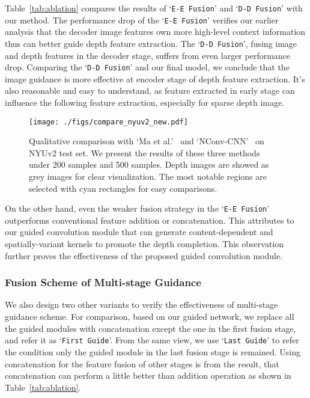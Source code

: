 \documentclass[journal]{IEEEtran}
\begin{document}
Table~\ref{tab:ablation} compares the results of `\texttt{E-E Fusion}' and `\texttt{D-D Fusion}' with our method.
The performance drop of the `\texttt{E-E Fusion}' verifies our earlier analysis that the decoder image features own more high-level context information thus can better guide depth feature extraction. 
The `\texttt{D-D Fusion}', fusing image and depth features in the decoder stage, suffers from even larger performance drop.
Comparing the `\texttt{D-D Fusion}' and our final model, we conclude that the image guidance is more effective at encoder stage of depth feature extraction.
It's also reasonable and easy to understand, as feature extracted in early stage can influence the following feature extraction, especially for sparse depth image.



\begin{figure*}
   \begin{center}
   \texttt{[image: ./figs/compare\_nyuv2\_new.pdf]}
   \end{center}
      \caption{Qualitative comparison with `Ma et al.'~\cite{sparse_to_dense} and `NConv-CNN'~\cite{cnn_confidence} on NYUv2 test set.
      We present the results of these three methods under 200 samples and 500 samples.
      Depth images are showed as grey images for clear visualization.
      The most notable regions are selected with cyan rectangles for easy comparisons.
      }
   \label{fig:compare_nyu_v2}
\end{figure*}

On the other hand, even the weaker fusion strategy in the `\texttt{E-E Fusion}' outperforms conventional feature addition or concatenation.
This attributes to our guided convolution module that can generate content-dependent and spatially-variant kernels to promote the depth completion.
This observation further proves the effectiveness of the proposed guided convolution module.



\subsubsection{Fusion Scheme of Multi-stage Guidance}
We also design two other variants to verify the effectiveness of multi-stage guidance scheme.
For comparison, based on our guided network, we replace all the guided modules with concatenation except the one in the first fusion stage,
and refer it as `\texttt{First Guide}'.
From the same view, we use `\texttt{Last Guide}' to refer the condition only the guided module in the last fusion stage is remained.
Using concatenation for the feature fusion of other stages is from the result,
that concatenation can perform a little better than addition operation as shown in Table~\ref{tab:ablation}.
\end{document}
